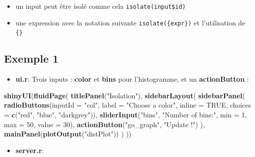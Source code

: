 \documentclass[
]{article}
\newenvironment{Shaded}{\begin{snugshade}}{\end{snugshade}}
\newcommand{\AttributeTok}[1]{\textcolor[rgb]{0.13,0.29,0.53}{#1}}
\newcommand{\ConstantTok}[1]{\textcolor[rgb]{0.56,0.35,0.01}{#1}}
\newcommand{\DecValTok}[1]{\textcolor[rgb]{0.00,0.00,0.81}{#1}}
\newcommand{\FunctionTok}[1]{\textcolor[rgb]{0.13,0.29,0.53}{\textbf{#1}}}
\newcommand{\NormalTok}[1]{#1}
\newcommand{\StringTok}[1]{\textcolor[rgb]{0.31,0.60,0.02}{#1}}
\providecommand{\tightlist}{%
  \setlength{\itemsep}{0pt}\setlength{\parskip}{0pt}}
\begin{document}
\begin{itemize}
\item
  un input peut être isolé comme cela \texttt{isolate(input\$id)}
\item
  une expression avec la notation suivante \texttt{isolate(\{expr\})} et
  l'utilisation de \texttt{\{\}}
\end{itemize}

\hypertarget{exemple-1}{%
\subsection{Exemple 1}\label{exemple-1}}

\begin{itemize}
\tightlist
\item
  \textbf{ui.r}: Trois inputs : \textbf{color} et \textbf{bins} pour
  l'histogramme, et un \textbf{actionButton} :
\end{itemize}

\begin{Shaded}
\begin{Highlighting}[]
\FunctionTok{shinyUI}\NormalTok{(}\FunctionTok{fluidPage}\NormalTok{(}
  \FunctionTok{titlePanel}\NormalTok{(}\StringTok{"Isolation"}\NormalTok{),}
  \FunctionTok{sidebarLayout}\NormalTok{(}
    \FunctionTok{sidebarPanel}\NormalTok{(}
      \FunctionTok{radioButtons}\NormalTok{(}\AttributeTok{inputId =} \StringTok{"col"}\NormalTok{, }\AttributeTok{label =} \StringTok{"Choose a color"}\NormalTok{, }\AttributeTok{inline =} \ConstantTok{TRUE}\NormalTok{,}
                   \AttributeTok{choices =} \FunctionTok{c}\NormalTok{(}\StringTok{"red"}\NormalTok{, }\StringTok{"blue"}\NormalTok{, }\StringTok{"darkgrey"}\NormalTok{)),}
      \FunctionTok{sliderInput}\NormalTok{(}\StringTok{"bins"}\NormalTok{, }\StringTok{"Number of bins:"}\NormalTok{, }\AttributeTok{min =} \DecValTok{1}\NormalTok{, }\AttributeTok{max =} \DecValTok{50}\NormalTok{, }\AttributeTok{value =} \DecValTok{30}\NormalTok{),}
      \FunctionTok{actionButton}\NormalTok{(}\StringTok{"go\_graph"}\NormalTok{, }\StringTok{"Update !"}\NormalTok{)}
\NormalTok{    ),}
    \FunctionTok{mainPanel}\NormalTok{(}\FunctionTok{plotOutput}\NormalTok{(}\StringTok{"distPlot"}\NormalTok{))}
\NormalTok{  )}
\NormalTok{))}
\end{Highlighting}
\end{Shaded}

\begin{itemize}
\tightlist
\item
  \textbf{server.r}:
\end{itemize}
\end{document}
